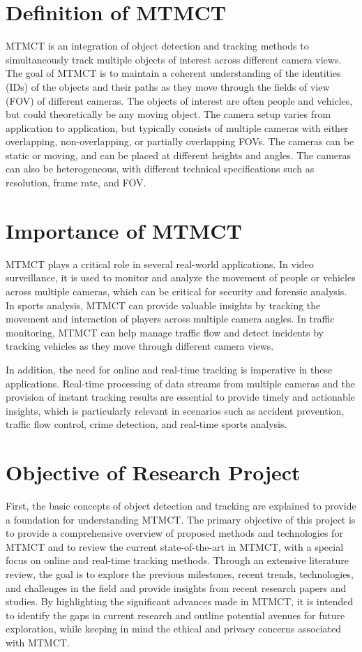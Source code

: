 \section{Definition of MTMCT}\label{sec:definition_of_mtmct}
MTMCT is an integration of object detection and tracking methods to simultaneously track multiple objects of interest across different camera views. The goal of MTMCT is to maintain a coherent understanding of the identities (IDs) of the objects and their paths as they move through the fields of view (FOV) of different cameras. The objects of interest are often people and vehicles, but could theoretically be any moving object. The camera setup varies from application to application, but typically consists of multiple cameras with either overlapping, non-overlapping, or partially overlapping FOVs. The cameras can be static or moving, and can be placed at different heights and angles. The cameras can also be heterogeneous, with different technical specifications such as resolution, frame rate, and FOV.

\section{Importance of MTMCT}\label{sec:importance_of_mtmct}
MTMCT plays a critical role in several real-world applications. In video surveillance, it is used to monitor and analyze the movement of people or vehicles across multiple cameras, which can be critical for security and forensic analysis. In sports analysis, MTMCT can provide valuable insights by tracking the movement and interaction of players across multiple camera angles. In traffic monitoring, MTMCT can help manage traffic flow and detect incidents by tracking vehicles as they move through different camera views.

In addition, the need for online and real-time tracking is imperative in these applications. Real-time processing of data streams from multiple cameras and the provision of instant tracking results are essential to provide timely and actionable insights, which is particularly relevant in scenarios such as accident prevention, traffic flow control, crime detection, and real-time sports analysis.

\section{Objective of Research Project}\label{sec:objective_of_review}
First, the basic concepts of object detection and tracking are explained to provide a foundation for understanding MTMCT. The primary objective of this project is to provide a comprehensive overview of proposed methods and technologies for MTMCT and to review the current state-of-the-art in MTMCT, with a special focus on online and real-time tracking methods. Through an extensive literature review, the goal is to explore the previous milestones, recent trends, technologies, and challenges in the field and provide insights from recent research papers and studies. By highlighting the significant advances made in MTMCT, it is intended to identify the gaps in current research and outline potential avenues for future exploration, while keeping in mind the ethical and privacy concerns associated with MTMCT.

